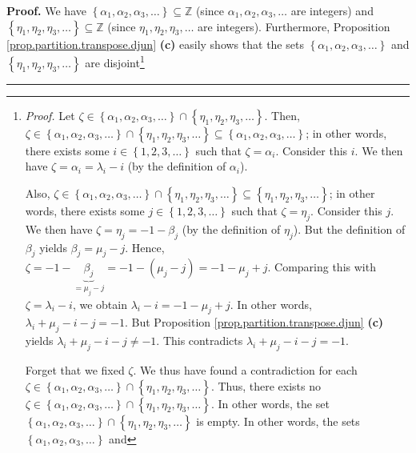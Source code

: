 \documentclass[numbers=enddot,12pt,final,onecolumn,notitlepage]{scrartcl}%
\theoremstyle{definition}
\newenvironment{proof}[1][Proof]{\noindent\textbf{#1.} }{\ \rule{0.5em}{0.5em}}
\newenvironment{verlong}{}{}
\begin{document}
\begin{verlong}
\begin{proof}
We have $\left\{  \alpha_{1},\alpha_{2},\alpha_{3},\ldots\right\}
\subseteq\mathbb{Z}$ (since $\alpha_{1},\alpha_{2},\alpha_{3},\ldots$ are
integers) and $\left\{  \eta_{1},\eta_{2},\eta_{3},\ldots\right\}
\subseteq\mathbb{Z}$ (since $\eta_{1},\eta_{2},\eta_{3},\ldots$ are integers).
Furthermore, Proposition \ref{prop.partition.transpose.djun} \textbf{(c)}
easily shows that the sets $\left\{  \alpha_{1},\alpha_{2},\alpha_{3}%
,\ldots\right\}  $ and $\left\{  \eta_{1},\eta_{2},\eta_{3},\ldots\right\}  $
are disjoint\footnote{\textit{Proof.} Let $\zeta\in\left\{  \alpha_{1}%
,\alpha_{2},\alpha_{3},\ldots\right\}  \cap\left\{  \eta_{1},\eta_{2},\eta
_{3},\ldots\right\}  $. Then, $\zeta\in\left\{  \alpha_{1},\alpha_{2}%
,\alpha_{3},\ldots\right\}  \cap\left\{  \eta_{1},\eta_{2},\eta_{3}%
,\ldots\right\}  \subseteq\left\{  \alpha_{1},\alpha_{2},\alpha_{3}%
,\ldots\right\}  $; in other words, there exists some $i\in\left\{
1,2,3,\ldots\right\}  $ such that $\zeta=\alpha_{i}$. Consider this $i$. We
then have $\zeta=\alpha_{i}=\lambda_{i}-i$ (by the definition of $\alpha_{i}%
$).
\par
Also, $\zeta\in\left\{  \alpha_{1},\alpha_{2},\alpha_{3},\ldots\right\}
\cap\left\{  \eta_{1},\eta_{2},\eta_{3},\ldots\right\}  \subseteq\left\{
\eta_{1},\eta_{2},\eta_{3},\ldots\right\}  $; in other words, there exists
some $j\in\left\{  1,2,3,\ldots\right\}  $ such that $\zeta=\eta_{j}$.
Consider this $j$. We then have $\zeta=\eta_{j}=-1-\beta_{j}$ (by the
definition of $\eta_{j}$). But the definition of $\beta_{j}$ yields $\beta
_{j}=\mu_{j}-j$. Hence, $\zeta=-1-\underbrace{\beta_{j}}_{=\mu_{j}%
-j}=-1-\left(  \mu_{j}-j\right)  =-1-\mu_{j}+j$. Comparing this with
$\zeta=\lambda_{i}-i$, we obtain $\lambda_{i}-i=-1-\mu_{j}+j$. In other words,
$\lambda_{i}+\mu_{j}-i-j=-1$. But Proposition
\ref{prop.partition.transpose.djun} \textbf{(c)} yields $\lambda_{i}+\mu
_{j}-i-j\neq-1$. This contradicts $\lambda_{i}+\mu_{j}-i-j=-1$.
\par
Forget that we fixed $\zeta$. We thus have found a contradiction for each
$\zeta\in\left\{  \alpha_{1},\alpha_{2},\alpha_{3},\ldots\right\}
\cap\left\{  \eta_{1},\eta_{2},\eta_{3},\ldots\right\}  $. Thus, there exists
no $\zeta\in\left\{  \alpha_{1},\alpha_{2},\alpha_{3},\ldots\right\}
\cap\left\{  \eta_{1},\eta_{2},\eta_{3},\ldots\right\}  $. In other words, the
set $\left\{  \alpha_{1},\alpha_{2},\alpha_{3},\ldots\right\}  \cap\left\{
\eta_{1},\eta_{2},\eta_{3},\ldots\right\}  $ is empty. In other words, the
sets $\left\{  \alpha_{1},\alpha_{2},\alpha_{3},\ldots\right\}  $ and
}
\end{proof}
\end{verlong}
\end{document}
